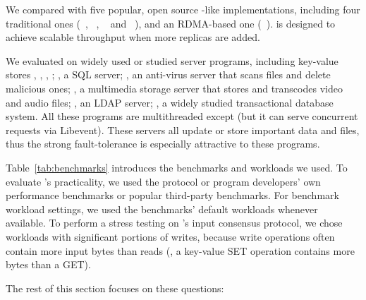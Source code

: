 

We compared \xxx with five popular, open source \paxos-like implementations,
including four traditional ones (\libpaxos~\cite{libpaxos},
\zookeeper~\cite{zookeeper}, \crane~\cite{crane:sosp15} and
\spaxos~\cite{spaxos:srds12}), and an RDMA-based one 
(\dare~\cite{dare:hpdc15}). \spaxos is designed to achieve scalable throughput 
when more replicas are added. 

We evaluated \xxx on \nprog widely used or studied server programs, including
\nkvprog key-value stores \redis, \memcached, \ssdb, \mongodb; \mysql, a SQL
server; \clamav, an anti-virus server that scans files and delete malicious ones;
\mediatomb, a multimedia storage server that stores and transcodes video and
audio files; \openldap, an LDAP server; \calvin, a widely studied transactional
database system. All these programs are multithreaded except \redis (but it can 
serve concurrent requests via Libevent). These servers all update or store 
important data and files, thus the strong \paxos fault-tolerance is especially 
attractive to these programs.

Table~\ref{tab:benchmarks} introduces the benchmarks and workloads we used. To
evaluate \xxx's practicality, we used the protocol or program developers' own 
performance benchmarks or popular third-party benchmarks. For benchmark 
workload settings, we used the benchmarks' default workloads whenever 
available. To perform a stress testing on \xxx's input consensus protocol, we 
chose workloads with significant portions of writes, because write operations 
often contain more input bytes than reads (\eg, a key-value SET operation 
contains more bytes than a GET).



The rest of this section focuses on these questions:

